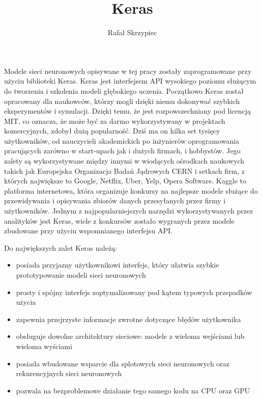 \documentclass[]{article}
\title{Keras}
\author{Rafa\l \vspace{1cm} Skrzypiec}
\date{}
\theoremstyle{definition}
\begin{document}



Modele sieci neuronowych opisywane w tej pracy zostały zaprogramowane przy użyciu biblioteki Keras. Keras jest interfejsem API wysokiego poziomu służącym do tworzenia i szkolenia modeli głębokiego uczenia. Początkowo Keras został opracowany dla naukowców, którzy mogli dzięki niemu dokonywać szybkich eksperymentów i symulacji. Dzięki temu, że jest rozpowszechniany pod licencją MIT, co oznacza, że może być za darmo wykorzystywany w projektach komercyjnych, zdobył dużą popularność. Dziś ma on kilka set tysięcy użytkowników, od nauczycieli akademickich po inżynierów oprogramowania pracujących zarówno w start-upach jak i dużych firmach, i hobbystów. Jego zalety są wykorzystywane między innymi w wiodących ośrodkach naukowych takich jak Europejska Organizacja Badań Jądrowych CERN i setkach firm, z których największe to Google, Netflix, Uber, Yelp, Opera Software. Kaggle to platforma internetowa, która organizuje konkursy na najlepsze modele służące do przewidywania i opisywania zbiorów danych przesyłanych przez firmy i użytkowników. Jednym z najpopularniejszych narzędzi wykorzystywanych przez analityków jest Keras, wiele z konkursów zostało wygranych przez modele zbudowane przy użyciu wspomnianego interfejsu API.

Do największych zalet Keras należą:
\begin{itemize}
\setlength\itemsep{0.em}

\item  posiada przyjazny użytkownikowi interfejs, który ułatwia szybkie prototypowanie modeli sieci neuronowych
\item  prosty i spójny interfejs zoptymalizowany pod kątem typowych przepadków użycia
\item  zapewnia przejrzyste informacje zwrotne dotyczące błędów użytkownika
\item  obsługuje dowolne architektury sieciowe: modele z wieloma wejściami lub wieloma wyściami
\item posiada wbudowane wsparcie dla splotowych sieci neuronowych oraz rekurencyjnych sieci neuronowych
\item  pozwala na bezproblemowe działanie tego samego kodu na CPU oraz GPU
\end{itemize}
\end{document}
